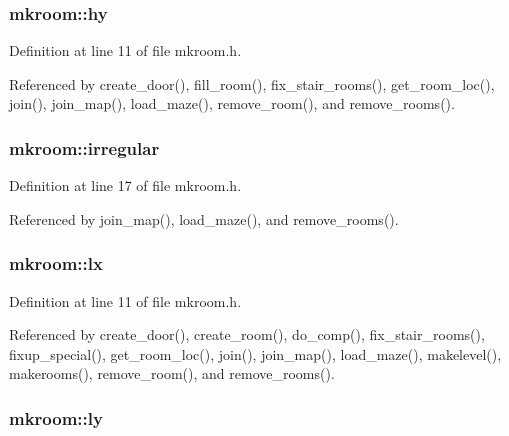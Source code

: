 \hypertarget{structmkroom_aa767bcbf6e0de868bba6d2a1c7e7182e}{
\subsubsection[{hy}]{ mkroom\+::hy}}\label{structmkroom_aa767bcbf6e0de868bba6d2a1c7e7182e}


Definition at line 11 of file mkroom.\+h.



Referenced by create\+\_\+door(), fill\+\_\+room(), fix\+\_\+stair\+\_\+rooms(), get\+\_\+room\+\_\+loc(), join(), join\+\_\+map(), load\+\_\+maze(), remove\+\_\+room(), and remove\+\_\+rooms().

\hypertarget{structmkroom_a394c3dd48b7fc60e0098c41afde6d6e8}{
\subsubsection[{irregular}]{ mkroom\+::irregular}}\label{structmkroom_a394c3dd48b7fc60e0098c41afde6d6e8}


Definition at line 17 of file mkroom.\+h.



Referenced by join\+\_\+map(), load\+\_\+maze(), and remove\+\_\+rooms().

\hypertarget{structmkroom_afbd368ef987a49bd9ea830f2019a565f}{
\subsubsection[{lx}]{ mkroom\+::lx}}\label{structmkroom_afbd368ef987a49bd9ea830f2019a565f}


Definition at line 11 of file mkroom.\+h.



Referenced by create\+\_\+door(), create\+\_\+room(), do\+\_\+comp(), fix\+\_\+stair\+\_\+rooms(), fixup\+\_\+special(), get\+\_\+room\+\_\+loc(), join(), join\+\_\+map(), load\+\_\+maze(), makelevel(), makerooms(), remove\+\_\+room(), and remove\+\_\+rooms().

\hypertarget{structmkroom_af60defeaae679cf06715a5b645e0d8b8}{
\subsubsection[{ly}]{ mkroom\+::ly}}\label{structmkroom_af60defeaae679cf06715a5b645e0d8b8}


